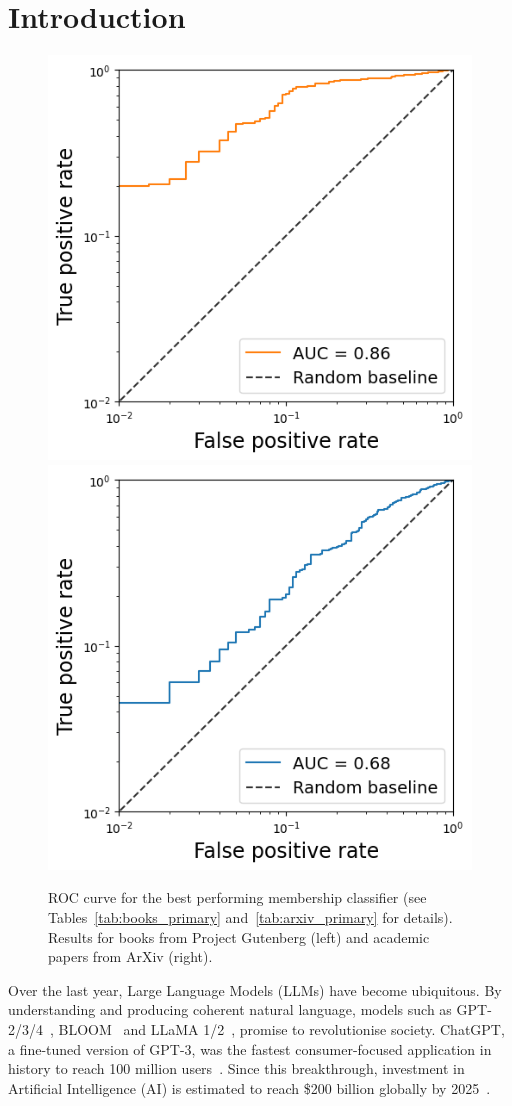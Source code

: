 \documentclass[twocolumn,10pt]{article}
\begin{document}
\section{Introduction}

\begin{figure}[t]
\centering
\includegraphics[width=0.49\linewidth]{figures/gutenberg_AUC_curve.png} 
\includegraphics[width=0.49\linewidth]{figures/arxiv_AUC_curve.png} 
    \caption{ROC curve for the best performing membership classifier (see Tables~\ref{tab:books_primary} and~\ref{tab:arxiv_primary} for details). Results for books from Project Gutenberg (left) and academic papers from ArXiv (right).} 
\label{fig:AUC_primary}
\end{figure}

Over the last year, Large Language Models (LLMs) have become ubiquitous. By understanding and producing coherent natural language, models such as GPT-2/3/4~\cite{radford2019language,brown2020language,gpt4techreport}, BLOOM~\cite{scao2022bloom} and LLaMA 1/2~\cite{touvron2023llama,touvron2023llama2}, promise to revolutionise society. ChatGPT, a fine-tuned version of GPT-3, was the fastest consumer-focused application in history to reach 100 million users~\cite{chatgptfastest}. Since this breakthrough, investment in Artificial Intelligence (AI) is estimated to reach \$200 billion globally by 2025~\cite{aiinvestmentforecast}. 
\end{document}
